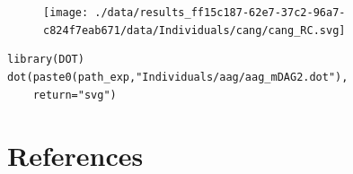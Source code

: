 \documentclass[
  letterpaper,
  DIV=11,
  numbers=noendperiod]{scrreprt}
\newlength{\cslhangindent}
\newlength{\cslentryspacingunit} %
\newenvironment{CSLReferences}[2] %
 {%
  \setlength{\parindent}{0pt}
  \ifodd #1
  \let\oldpar\par
  \def\par{\hangindent=\cslhangindent\oldpar}
  \fi
  \setlength{\parskip}{#2\cslentryspacingunit}
 }%
 {}
\begin{document}
\begin{figure}[H]

{\centering \texttt{[image: ./data/results\_ff15c187-62e7-37c2-96a7-c824f7eab671/data/Individuals/cang/cang\_RC.svg]}

}

\end{figure}

\begin{verbatim}
library(DOT)
dot(paste0(path_exp,"Individuals/aag/aag_mDAG2.dot"),
    return="svg")
\end{verbatim}


\hypertarget{references}{%
\chapter*{References}\label{references}}


\hypertarget{refs}{}
\begin{CSLReferences}{0}{0}
\end{CSLReferences}
\end{document}
